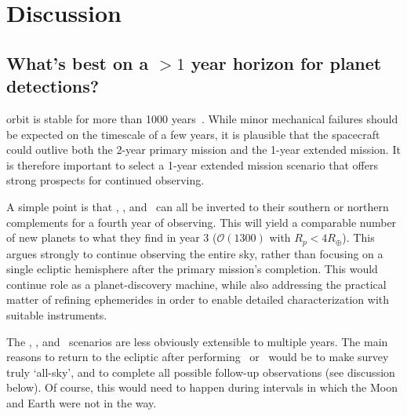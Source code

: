 \section{Discussion} 
\label{sec:discussion}

\subsection{What's best on a $>1$ year horizon for planet detections?}
\label{sec:gtr_1yr_horizon}

\tesss orbit is stable for more than 1000 years~\citep{gangestad_high_2013}.
While minor mechanical failures should be expected on the timescale of a few years, it is plausible that the spacecraft could outlive both the 2-year primary mission and the 1-year extended mission.
It is therefore important to select a 1-year extended mission scenario that offers strong prospects for continued observing.

A simple point is that \nhemi, \npole, and \shemiAvoid\ can all be inverted to their southern or northern complements for a fourth year of observing.
This will yield a comparable number of new planets to what they find in year 3 ($\mathcal{O}(1300)$ with $R_p<4R_\oplus$).
This argues strongly to continue observing the entire sky, rather than focusing on a single ecliptic hemisphere after the primary mission's completion.
This would continue \tesss role as a planet-discovery machine, while also addressing the practical matter of refining ephemerides in order to enable detailed characterization with suitable instruments.

The \elong, \eshort, and \hemis\ scenarios are less obviously extensible to multiple years.
The main reasons to return to the ecliptic after performing \elong\ or \eshort\ would be to make \tesss survey truly `all-sky', and to complete all possible \ktwo follow-up observations (see discussion below).
Of course, this would need to happen during intervals in which the Moon and Earth were not in the way.

